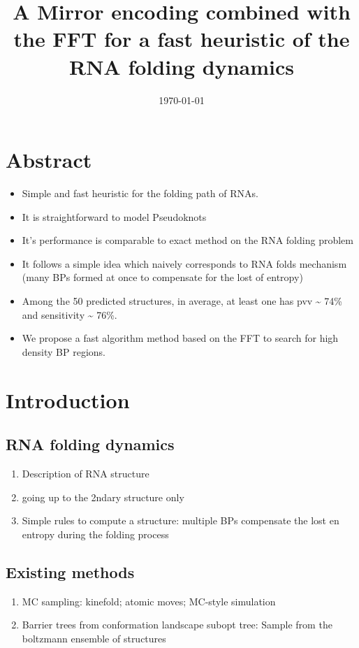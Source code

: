 \documentclass[a4paper,12pt]{article}
\date{\today}
\title{A Mirror encoding combined with the FFT for a fast heuristic of the RNA folding dynamics}
\begin{document}
\maketitle

\section{Abstract}
\label{sec:org24465a6}
\begin{itemize}
\item Simple and fast heuristic for the folding path of RNAs.
\item It is straightforward to model Pseudoknots
\item It's performance is comparable to exact method on the RNA folding problem
\item It follows a simple idea which naively corresponds to RNA folds mechanism
(many BPs formed at once to compensate for the lost of entropy)
\item Among the 50 predicted structures, in average, at least one has pvv \textasciitilde{} 74\% and
sensitivity \textasciitilde{} 76\%.
\item We propose a fast algorithm method based on the FFT to search for high density
BP regions.
\end{itemize}

\section{Introduction}
\label{sec:org032f979}
\clearpage
\subsection{RNA folding dynamics}
\label{sec:org76c62ec}
\begin{enumerate}
\item Description of RNA structure
\item going up to the 2ndary structure only
\item Simple rules to compute a structure: multiple BPs compensate the lost en
entropy during the folding process
\end{enumerate}

\clearpage
\subsection{Existing methods}
\label{sec:orga28bff2}
\begin{enumerate}
\item MC sampling: kinefold; atomic moves; MC-style simulation
\item Barrier trees from conformation landscape subopt tree: Sample from the
boltzmann ensemble of structures
\end{enumerate}
\end{document}
